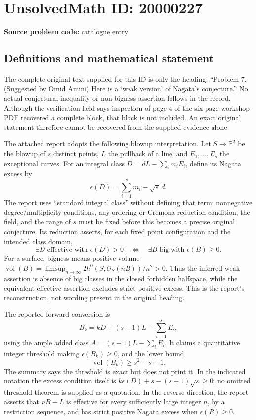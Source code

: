 \documentclass[11pt]{article}
\newcommand{\PP}{\mathbb{P}}
\begin{document}
\section*{UnsolvedMath ID: 20000227}
\textbf{Source problem code:} catalogue entry
\subsection{Definitions and mathematical statement}
The complete original text supplied for this ID is only the heading: ``Problem 7. (Suggested by Omid Amini) Here is a `weak version' of Nagata's conjecture.'' No actual conjectural inequality or non-bigness assertion follows in the record. Although the verification field says inspection of page 4 of the six-page workshop PDF recovered a complete block, that block is not included. An exact original statement therefore cannot be recovered from the supplied evidence alone.

The attached report adopts the following blowup interpretation. Let \(S\to\PP^2\) be the blowup of \(s\) distinct points, \(L\) the pullback of a line, and \(E_1,\ldots,E_s\) the exceptional curves. For an integral class \(D=dL-\sum_i m_iE_i\), define its Nagata excess by
\[
\epsilon(D)=\sum_{i=1}^s m_i-\sqrt{s}\,d.
\]
The report uses ``standard integral class'' without defining that term; nonnegative degree/multiplicity conditions, any ordering or Cremona-reduction condition, the field, and the range of \(s\) must be fixed before this becomes a precise original conjecture. Its reduction asserts, for each fixed point configuration and the intended class domain,
\[
\exists D\text{ effective with }\epsilon(D)>0
\quad\Longleftrightarrow\quad
\exists B\text{ big with }\epsilon(B)\geq0.
\]
For a surface, bigness means positive volume
\(\operatorname{vol}(B)=\limsup_{n\to\infty}2h^0(S,\mathcal O_S(nB))/n^2>0\).
Thus the inferred weak assertion is absence of big classes in the closed forbidden halfspace, while the equivalent effective assertion excludes strict positive excess. This is the report's reconstruction, not wording present in the original heading.

The reported forward conversion is
\[
B_k=kD+(s+1)L-\sum_{i=1}^sE_i,
\]
using the ample added class \(A=(s+1)L-\sum_iE_i\). It claims a quantitative integer threshold making \(\epsilon(B_k)\geq0\), and the lower bound
\[
\operatorname{vol}(B_k)\geq s^2+s+1.
\]
The summary says the threshold is exact but does not print it. In the indicated notation the excess condition itself is
\(k\epsilon(D)+s-(s+1)\sqrt{s}\geq0\); no omitted threshold theorem is supplied as a quotation. In the reverse direction, the report asserts that \(nB-L\) is effective for every sufficiently large integer \(n\), by a restriction sequence, and has strict positive Nagata excess when \(\epsilon(B)\geq0\).
\end{document}

